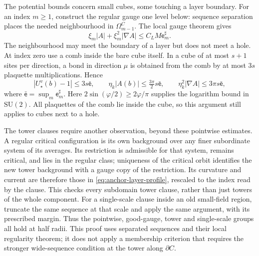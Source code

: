 \documentclass[11pt,letterpaper,reqno]{amsart}
\theoremstyle{definition}
\theoremstyle{remark}
\newcommand{\SU}{\mathrm{SU}}
\begin{document}
The potential bounds concern small cubes, some touching
a layer boundary. For an index \(m\ge1\), construct the
regular gauge one level below: sequence separation places
the needed neighbourhood in \(\Omega^C_{m-1}\).
The local gauge theorem gives
\[
 \xi_m|A|+\xi_m^2|\nabla A|
                   \le C_LM\mathsf e^\sharp_m.
\]
The neighbourhood may meet the boundary of a layer but
does not meet a hole. At index zero use a comb inside
the bare cube itself. In a cube of at most \(s+1\)
sites per direction, a bond in direction \(\mu\)
is obtained from the comb by at most \(3s\)
plaquette multiplications. Hence
\[
 |U_\star^v(b)-1|\le3s\bar{\mathsf e},
 \qquad
 \eta_k|A(b)|\le\tfrac{3\pi}{2}s\bar{\mathsf e},
 \qquad
 \eta_k^2|\nabla A|\le3\pi s\bar{\mathsf e},
\]
where \(\bar{\mathsf e}=\sup_m\mathsf e^\sharp_m\).
Here \(2\sin(\varphi/2)\ge2\varphi/\pi\) supplies
the logarithm bound in \(\SU(2)\). All plaquettes of
the comb lie inside the cube, so this argument still
applies to cubes next to a hole.

The tower clauses require another observation, beyond
these pointwise estimates. A regular critical configuration
is its own background over any finer subordinate system
of its averages. Its restriction is admissible for that
system, remains critical, and lies in the regular class;
uniqueness of the critical orbit identifies the new
tower background with a gauge copy of the restriction.
Its curvature and current are therefore those in
\eqref{eq:anchor-layer-profile}, rescaled to the
index read by the clause. This checks every subdomain
tower clause, rather than just towers of the whole
component. For a single-scale clause inside an old
small-field region, truncate the same sequence at that
scale and apply the same argument, with its prescribed
margin. Thus the pointwise, good-gauge, tower and
single-scale groups all hold at half radii.
This proof uses separated sequences and their local
regularity theorem; it does not apply a membership
criterion that requires the stronger wide-sequence
condition at the tower along \(\partial C\).
\end{document}
